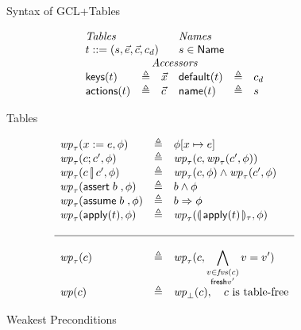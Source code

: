 \begin{figure}[ht]
  \caption{Syntax of GCL+Tables}
  \label{fig:syntaxgcl}
  
\end{figure}


\begin{figure}[ht]
  \[\begin{array}{l >{\triangleq}c l l >{\triangleq}c l}
      \multicolumn 3 l {\textit{Tables}}  & \multicolumn 3 l {\textit{Names}}\\
      \multicolumn 3 l {t::= (s,\vec e, \vec c, c_d)} & \multicolumn 3 l {s \in \Name}\\
      \multicolumn 6 c {\textit{Accessors}}\\
      \keys t && \vec x &  \default t && c_d \\
      \actions t && \vec c & \name t && s
    \end{array}\]

  \caption{Tables}
  \label{fig:tables}
\end{figure}

\begin{figure}[ht]
  \[\begin{array}{l >{\triangleq}c l}
      \wp_\tau(x:=e, \phi) && \phi[x \mapsto e]\\
      \wp_\tau(c;c', \phi) && \wp_\tau(c, \wp_\tau(c', \phi)) \\
      \wp_\tau(c\angel c', \phi) && \wp_\tau(c, \phi) \wedge \wp_\tau(c',\phi) \\
      \wp_\tau(\assert b, \phi) && b \wedge \phi \\
      \wp_\tau(\assume b, \phi) && b \Rightarrow \phi \\
      \wp_\tau(\apply t, \phi) && \wp_\tau(\parenbb{\apply t}_\tau, \phi)\\\\\hline\\
      
      \wp_\tau(c) && \wp_\tau(c,\displaystyle \bigwedge_{\substack{v \in \fvs(c) \\ \mathsf{fresh} v'}} v = v') \\
      \wp(c) && \wp_\bot(c), \quad c \text{ is table-free}
    \end{array}\]
  \caption{Weakest Preconditions}
  \label{fig:wp}
\end{figure}

